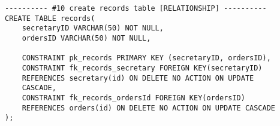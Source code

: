 \begin{lstlisting}
---------- #10 create records table [RELATIONSHIP] ----------
CREATE TABLE records(
    secretaryID VARCHAR(50) NOT NULL,
    ordersID VARCHAR(50) NOT NULL,
    
    CONSTRAINT pk_records PRIMARY KEY (secretaryID, ordersID),
    CONSTRAINT fk_records_secretary FOREIGN KEY(secretaryID) 
    REFERENCES secretary(id) ON DELETE NO ACTION ON UPDATE 
    CASCADE,
    CONSTRAINT fk_records_ordersId FOREIGN KEY(ordersID) 
    REFERENCES orders(id) ON DELETE NO ACTION ON UPDATE CASCADE
);
\end{lstlisting}